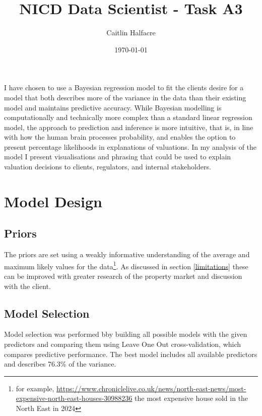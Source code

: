 \documentclass{scrartcl}
\author{Caitlin Halfacre}
\date{\today}
\title{NICD Data Scientist - Task A3}
\begin{document}
\maketitle
I have chosen to use a Bayesian regression model to fit the clients desire for a model that both describes more of the variance in the data than their existing model and maintains predictive accuracy. While Bayesian modelling is computationally and technically more complex than a standard linear regression model, the approach to prediction and inference is more intuitive, that is, in line with how the human brain processes probability, and enables the option to present percentage likelihoods in explanations of valuations. In my analysis of the model I present visualisations and phrasing that could be used to explain valuation decisions to clients, regulators, and internal stakeholders.

\FloatBarrier
\section{Model Design}
\subsection{Priors}
The priors are set using a  weakly informative understanding of the average and maximum likely values for the data\footnote{for example, \url{https://www.chroniclelive.co.uk/news/north-east-news/most-expensive-north-east-houses-30988236} the most expensive house sold in the North East in 2024}. As discussed in section \ref{limitations} these can be improved with greater research of the property market and discussion with the client.

\subsection{Model Selection}
Model selection was performed bby building all possible models with the given predictors and comparing them using Leave One Out cross-validation, which compares predictive performance. The best model includes all available predictors and describes 76.3\% of the variance.

\FloatBarrier
\end{document}
